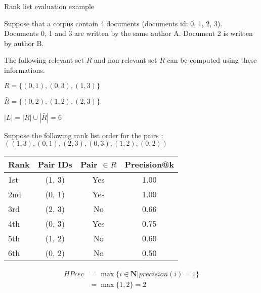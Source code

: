 \begin{example}
  \centering
  \caption{Rank list evaluation example}
  \label{ex:rank_list_eval}


  \begin{subexample}{\linewidth}

  Suppose that a corpus contain 4 documents (documents id: 0, 1, 2, 3).
  Documents 0, 1 and 3 are written by the same author A.
  Document 2 is written by author B.

  The following relevant set $R$ and non-relevant set $\bar{R}$ can be computed using these informations.

  $R = \{(0, 1), (0, 3), (1, 3) \}$

  $\bar{R} = \{(0, 2), (1, 2), (2, 3) \}$

  $|L| = |R| \cup |\bar{R}| = 6$

  Suppose the following rank list order for the pairs :
  $((1, 3), (0, 1), (2, 3), (0, 3), (1, 2), (0, 2))$
  \end{subexample}

  \vspace{0.5cm}

  \begin{subexample}{\linewidth}
    \centering
    \begin{tabular}{l c c c}
      \toprule
      Rank  & Pair IDs & Pair $\in R$ & Precision@k\\
      \midrule
      1st   & (1, 3)   & Yes  & 1.00 \\
      2nd   & (0, 1)   & Yes  & 1.00 \\
      3rd   & (2, 3)   & No   & 0.66 \\
      4th   & (0, 3)   & Yes  & 0.75 \\
      5th   & (1, 2)   & No   & 0.60 \\
      6th   & (0, 2)   & No   & 0.50 \\
      \bottomrule
    \end{tabular}
  \end{subexample}

  \vspace{0.5cm}

  \begin{subexample}{\linewidth}
    \begin{equation}
      \begin{split}
        HPrec &= \max\{i \in \mathbf{N} | precision(i) = 1\} \\
              &= \max\{1, 2\} = 2 \\
      \end{split}
    \end{equation}
  \end{subexample}


\end{example}
